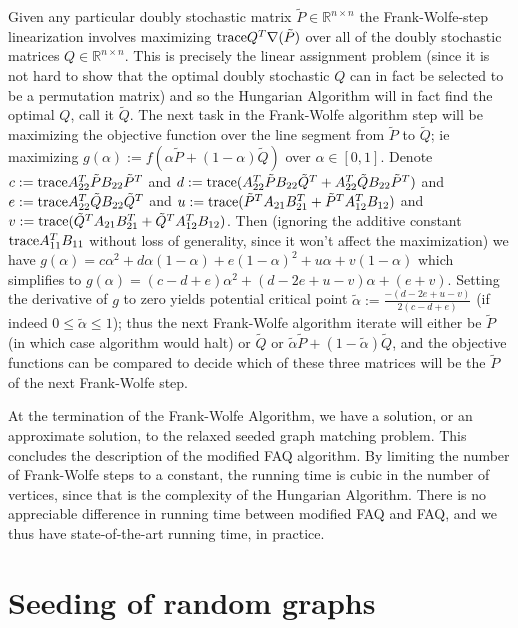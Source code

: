 \documentclass[12pt]{article}
\newcommand{\R}{\mathbb{R}}
\newcommand{\tr}{\textup{trace}}
\begin{document}
Given any particular doubly stochastic matrix $\tilde{P} \in \R^{n \times n}$
the Frank-Wolfe-step linearization involves maximizing $\tr Q^T \nabla(\tilde{P})$ over all of the doubly stochastic matrices $Q \in \R ^{n \times n}$.
This is precisely the linear assignment problem (since it is not hard to show that
the optimal doubly stochastic $Q$ can in fact be selected to be
a permutation matrix) and so
the Hungarian Algorithm
will in fact find the optimal $Q$, call it
$\tilde{Q}$.
The next task in the Frank-Wolfe algorithm step
will be maximizing the objective function over the line
segment from $\tilde{P}$ to $\tilde{Q}$;  ie maximizing $g(\alpha):=f(\alpha \tilde{P}
+(1-\alpha ) \tilde{Q})$ over $\alpha \in [0,1]$. Denote
$c:=\tr A^T_{22} \tilde{P} B_{22} \tilde{P}^T$ and
$d:=\tr (A^T_{22} \tilde{P} B_{22} \tilde{Q}^T +
    A^T_{22} \tilde{Q} B_{22} \tilde{P}^T)$ and
$e:=\tr A^T_{22} \tilde{Q} B_{22} \tilde{Q}^T$ and
$u:=\tr ( \tilde{P}^TA_{21}B_{21}^T   + \tilde{P}^TA_{12}^TB_{12} )$ and
$v:=\tr ( \tilde{Q}^TA_{21}B_{21}^T   + \tilde{Q}^TA_{12}^TB_{12} )$. Then
(ignoring the additive constant $\tr A_{11}^TB_{11}$ without loss of
generality, since it won't affect the maximization)
we have $g(\alpha)=c \alpha^2+d \alpha (1-\alpha)
+e(1-\alpha)^2+u \alpha + v(1-\alpha)$  which simplifies to
$g(\alpha)=(c-d+e)\alpha^2+(d-2e+u-v)\alpha + (e+v)$. Setting the
derivative of $g$ to zero yields potential critical point
$\tilde{\alpha}:=\frac{-(d-2e+u-v)}{2(c-d+e)}$ (if indeed
$0 \leq \tilde{\alpha}\leq 1$); thus the next Frank-Wolfe algorithm
iterate will either be $\tilde{P}$ (in which case algorithm would halt)
or $\tilde{Q}$ or $\tilde{\alpha}\tilde{P}+(1-\tilde{\alpha})\tilde{Q}$, and
the objective functions can be compared to decide which of these three matrices
will be the $\tilde{P}$ of the next Frank-Wolfe step.

At the termination of the Frank-Wolfe Algorithm, we have a solution, or
an approximate solution, to the relaxed
seeded graph matching problem. This concludes the description of the
modified FAQ algorithm. By limiting the number of Frank-Wolfe steps to 
a constant, the running time is cubic in the number of vertices, since that 
is the complexity of the Hungarian Algorithm. There is no appreciable 
difference in running time between modified FAQ and FAQ, and we
thus have state-of-the-art running time, in practice.


\section{Seeding of random graphs  \label{srg}}
\end{document}
